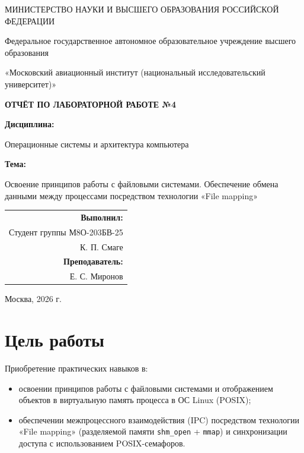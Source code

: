 \documentclass[11pt, a4paper]{article}
\begin{document}
\begin{titlepage}
    \centering
    {\small МИНИСТЕРСТВО НАУКИ И ВЫСШЕГО ОБРАЗОВАНИЯ РОССИЙСКОЙ ФЕДЕРАЦИИ\par}
    \vspace{0.3cm}
    {\small Федеральное государственное автономное образовательное учреждение высшего образования\par}
    {\small «Московский авиационный институт (национальный исследовательский университет)»\par}
    
    \vspace{4cm}
    {\Large \textbf{ОТЧЁТ ПО ЛАБОРАТОРНОЙ РАБОТЕ №4}\par}
    
    \vspace{1.2cm}
    {\large \textbf{Дисциплина:}\par}
    {\large Операционные системы и архитектура компьютера\par}
    
    \vspace{0.8cm}
    {\large \textbf{Тема:}\par}
    {\large Освоение принципов работы с файловыми системами. Обеспечение обмена данными между процессами посредством технологии «File mapping»\par}
    
    \vspace{3.5cm}
    \begin{flushright}
        \begin{tabular}{@{}r@{}}
            \textbf{Выполнил:} \\
            Студент группы М8О-203БВ-25 \\
            К. П. Смаге \\[0.8cm]
            \textbf{Преподаватель:} \\
            Е. С. Миронов \\
        \end{tabular}
    \end{flushright}
    
    \vfill
    {\large Москва, 2026 г.\par}
\end{titlepage}

\section{Цель работы}
Приобретение практических навыков в:
\begin{itemize}
    \item освоении принципов работы с файловыми системами и отображением объектов в виртуальную память процесса в ОС Linux (POSIX);
    \item обеспечении межпроцессного взаимодействия (IPC) посредством технологии «File mapping» (разделяемой памяти \texttt{shm\_open} + \texttt{mmap}) и синхронизации доступа с использованием POSIX-семафоров.
\end{itemize}
\end{document}
